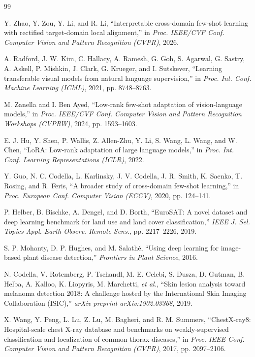 \documentclass[conference]{IEEEtran}
\begin{document}
\begin{thebibliography}{99}

 Y. Zhao, Y. Zou, Y. Li, and R. Li, ``Interpretable cross-domain few-shot learning with rectified target-domain local alignment,'' in \emph{Proc. IEEE/CVF Conf. Computer Vision and Pattern Recognition (CVPR)}, 2026.

 A. Radford, J. W. Kim, C. Hallacy, A. Ramesh, G. Goh, S. Agarwal, G. Sastry, A. Askell, P. Mishkin, J. Clark, G. Krueger, and I. Sutskever, ``Learning transferable visual models from natural language supervision,'' in \emph{Proc. Int. Conf. Machine Learning (ICML)}, 2021, pp. 8748--8763.

 M. Zanella and I. Ben Ayed, ``Low-rank few-shot adaptation of vision-language models,'' in \emph{Proc. IEEE/CVF Conf. Computer Vision and Pattern Recognition Workshops (CVPRW)}, 2024, pp. 1593--1603.

 E. J. Hu, Y. Shen, P. Wallis, Z. Allen-Zhu, Y. Li, S. Wang, L. Wang, and W. Chen, ``LoRA: Low-rank adaptation of large language models,'' in \emph{Proc. Int. Conf. Learning Representations (ICLR)}, 2022.

 Y. Guo, N. C. Codella, L. Karlinsky, J. V. Codella, J. R. Smith, K. Saenko, T. Rosing, and R. Feris, ``A broader study of cross-domain few-shot learning,'' in \emph{Proc. European Conf. Computer Vision (ECCV)}, 2020, pp. 124--141.

 P. Helber, B. Bischke, A. Dengel, and D. Borth, ``EuroSAT: A novel dataset and deep learning benchmark for land use and land cover classification,'' \emph{IEEE J. Sel. Topics Appl. Earth Observ. Remote Sens.}, pp. 2217--2226, 2019.

 S. P. Mohanty, D. P. Hughes, and M. Salath\'e, ``Using deep learning for image-based plant disease detection,'' \emph{Frontiers in Plant Science}, 2016.

 N. Codella, V. Rotemberg, P. Tschandl, M. E. Celebi, S. Dusza, D. Gutman, B. Helba, A. Kalloo, K. Liopyris, M. Marchetti, \emph{et al.}, ``Skin lesion analysis toward melanoma detection 2018: A challenge hosted by the International Skin Imaging Collaboration (ISIC),'' \emph{arXiv preprint arXiv:1902.03368}, 2019.

 X. Wang, Y. Peng, L. Lu, Z. Lu, M. Bagheri, and R. M. Summers, ``ChestX-ray8: Hospital-scale chest X-ray database and benchmarks on weakly-supervised classification and localization of common thorax diseases,'' in \emph{Proc. IEEE Conf. Computer Vision and Pattern Recognition (CVPR)}, 2017, pp. 2097--2106.


\end{thebibliography}
\end{document}
